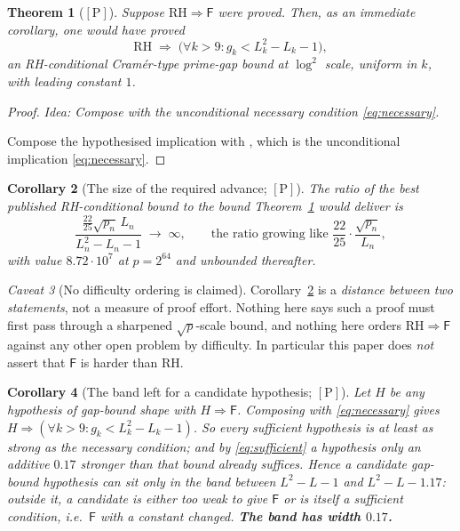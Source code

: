 \documentclass[11pt,a4paper]{article}
\theoremstyle{plain}
\newtheorem{theorem}{Theorem}[section]
\newtheorem{corollary}[theorem]{Corollary}
\theoremstyle{definition}
\theoremstyle{remark}
\newtheorem{hazard}[theorem]{Caveat}
\newcommand{\idea}[1]{\emph{Idea: #1}\par\smallskip}
\newcommand{\cP}{{[\mathrm{P}]}}
\newcommand{\Fb}{\mathsf{F}}
\begin{document}
\begin{theorem}[$\cP$]
\label{thm:D}
Suppose $\mathrm{RH} \Rightarrow \Fb$ were proved. Then, as an immediate corollary, one would
have proved
\[
\mathrm{RH} \;\Longrightarrow\; \bigl(\forall k > 9 : g_k < L_k^2 - L_k - 1\bigr),
\]
an RH-conditional Cram\'er-type prime-gap bound at $\log^2$ scale, uniform in $k$, with
leading constant $1$.
\end{theorem}

\begin{proof}
\idea{Compose with the unconditional necessary condition \eqref{eq:necessary}.}
Compose the hypothesised implication with \cite[\S2, Thm.~1]{kourbatov2015bounds}, which is
the unconditional implication \eqref{eq:necessary}.
\end{proof}

\begin{corollary}[The size of the required advance; $\cP$]
\label{cor:D1}
The ratio of the best published RH-conditional bound to the bound Theorem~\ref{thm:D} would
deliver is
\[
\frac{\tfrac{22}{25}\sqrt{p_n}\,L_n}{L_n^2 - L_n - 1} \;\longrightarrow\; \infty ,
\qquad\text{the ratio growing like } \frac{22}{25}\cdot\frac{\sqrt{p_n}}{L_n} ,
\]
with value $8.72\cdot10^7$ at $p = 2^{64}$ and unbounded thereafter.
\end{corollary}

\begin{hazard}[No difficulty ordering is claimed]
\label{haz:noorder}
Corollary~\ref{cor:D1} is a \emph{distance between two statements}, not a measure of proof
effort. Nothing here says such a proof must first pass through a sharpened $\sqrt{p}$-scale
bound, and nothing here orders $\mathrm{RH}\Rightarrow\Fb$ against any other open problem by
difficulty. In particular this paper does \emph{not} assert that $\Fb$ is harder than RH.
\end{hazard}

\begin{corollary}[The band left for a candidate hypothesis; $\cP$]
\label{cor:D2}
Let $H$ be any hypothesis of gap-bound shape with $H \Rightarrow \Fb$. Composing with
\eqref{eq:necessary} gives $H \Rightarrow (\forall k > 9 : g_k < L_k^2 - L_k - 1)$. So every
sufficient hypothesis is at least as strong as the necessary condition; and by
\eqref{eq:sufficient} a hypothesis only an additive $0.17$ stronger than that bound already
suffices. Hence a candidate gap-bound hypothesis can sit only in the band between
$L^2 - L - 1$ and $L^2 - L - 1.17$: outside it, a candidate is either too weak to give $\Fb$
or is itself a sufficient condition, i.e.\ $\Fb$ with a constant changed. \textbf{The band has
width $0.17$.}
\end{corollary}
\end{document}
